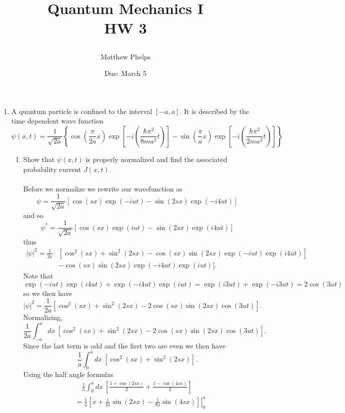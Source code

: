 \documentclass[11pt,letterpaper]{article}
\title{\begin{spacing}{1.2}Quantum Mechanics I\\HW 3\end{spacing}}
\author{Matthew Phelps}
\date{Due: March 5}
\begin{document}
\maketitle

\begin{enumerate}
  \item 
  
  
  A quantum particle is confined to the interval $[-a,a]$. It is described by the time dependent wave function
  \[
  	\psi(x,t) = \frac{1}{\sqrt{2a}}\left\{\cos\left(\frac{\pi}{2a}x\right)\exp{\left[-i\left(\frac{\hbar\pi^2}{8ma^2}t\right)		\right]}-\sin\left(\frac{\pi}{a}x\right)\exp{\left[-i\left(\frac{\hbar\pi^2}{2ma^2}t\right)\right]}\right\}
  \]
  
    \begin{enumerate}
\item Show that $\psi(x,t)$ is properly normalized and find the associated probability current $J(x,t)$.
\\
\\
Before we normalize we rewrite our wavefunction as
\begin{equation}\label{1}\psi = \frac{1}{\sqrt{2a}}[\cos(sx)\exp{(-iut)}-\sin(2sx)\exp{(-i4ut)}]\end{equation}
and so
\begin{equation}\label{2}\psi^* = \frac{1}{\sqrt{2a}}[\cos(sx)\exp{(iut)}-\sin(2sx)\exp{(i4ut)}]\end{equation}
thus
\begin{align*}|\psi|^2 = \frac{1}{2a}&[\cos^2(sx)+\sin^2(2sx)-\cos(sx)\sin(2sx)\exp(-iut)\exp(i4ut)]\\
&-\cos(sx)\sin(2sx)\exp(-i4ut)\exp(iut)].
\end{align*}
Note that
$$\exp(-iut)\exp(i4ut)+\exp(-i4ut)\exp(iut) = \exp(i3ut)+\exp(-i3ut) = 2\cos(3ut)$$
so we then have
\begin{equation}\label{4} |\psi|^2 = \frac{1}{2a}[\cos^2(sx)+\sin^2(2sx)-2\cos(sx)\sin(2sx)\cos(3ut)].\end{equation}
Normalizing,
$$\frac{1}{2a}\int_{-a}^a{dx\ [\cos^2(sx)+\sin^2(2sx)-2\cos(sx)\sin(2sx)\cos(3ut)]}. $$
Since the last term is odd and the first two are even we then have
$$\frac{1}{a}\int_{0}^a{dx\ [\cos^2(sx)+\sin^2(2sx)]}. $$
Using the half angle formulas
\begin{align*}&\quad\frac{1}{a}\int_{0}^a{dx\ \left[\frac{1+\cos(2sx)}{2}+\frac{1-\cos(4sx)}{2}\right]}\\
&=\frac{1}{a}\left.\left[x+\frac{1}{4s}\sin(2sx)-\frac{1}{8s}\sin(4sx)\right]\right|_0^a\\

\end{align*}
\end{enumerate}
\end{enumerate}
\end{document}
